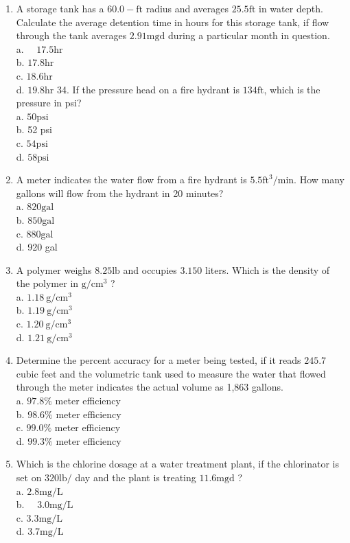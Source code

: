 \documentclass[10pt]{article}
\begin{document}
\begin{enumerate}
  \item A storage tank has a $60.0-\mathrm{ft}$ radius and averages $25.5 \mathrm{ft}$ in water depth. Calculate the average detention time in hours for this storage tank, if flow through the tank averages $2.91 \mathrm{mgd}$ during a particular month in question.\\
a. $\quad 17.5 \mathrm{hr}$\\
b. $17.8 \mathrm{hr}$\\
c. $18.6 \mathrm{hr}$\\
d. $19.8 \mathrm{hr}$ 34. If the pressure head on a fire hydrant is $134 \mathrm{ft}$, which is the pressure in psi?\\
a. $50 \mathrm{psi}$\\
b. 52 psi\\
c. $54 \mathrm{psi}$\\
d. $58 \mathrm{psi}$

  \item A meter indicates the water flow from a fire hydrant is $5.5 \mathrm{ft}^{3} / \mathrm{min}$. How many gallons will flow from the hydrant in 20 minutes?\\
a. $820 \mathrm{gal}$\\
b. $850 \mathrm{gal}$\\
c. $880 \mathrm{gal}$\\
d. 920 gal

  \item A polymer weighs $8.25 \mathrm{lb}$ and occupies $3.150$ liters. Which is the density of the polymer in $\mathrm{g} / \mathrm{cm}^{3}$ ?\\
a. $1.18 \mathrm{~g} / \mathrm{cm}^{3}$\\
b. $1.19 \mathrm{~g} / \mathrm{cm}^{3}$\\
c. $1.20 \mathrm{~g} / \mathrm{cm}^{3}$\\
d. $1.21 \mathrm{~g} / \mathrm{cm}^{3}$

  \item Determine the percent accuracy for a meter being tested, if it reads $245.7$ cubic feet and the volumetric tank used to measure the water that flowed through the meter indicates the actual volume as 1,863 gallons.\\
a. $97.8 \%$ meter efficiency\\
b. $98.6 \%$ meter efficiency\\
c. $99.0 \%$ meter efficiency\\
d. $99.3 \%$ meter efficiency

  \item Which is the chlorine dosage at a water treatment plant, if the chlorinator is set on $320 \mathrm{lb} /$ day and the plant is treating $11.6 \mathrm{mgd}$ ?\\
a. $2.8 \mathrm{mg} / \mathrm{L}$\\
b. $\quad 3.0 \mathrm{mg} / \mathrm{L}$\\
c. $3.3 \mathrm{mg} / \mathrm{L}$\\
d. $3.7 \mathrm{mg} / \mathrm{L}$


\end{enumerate}
\end{document}
